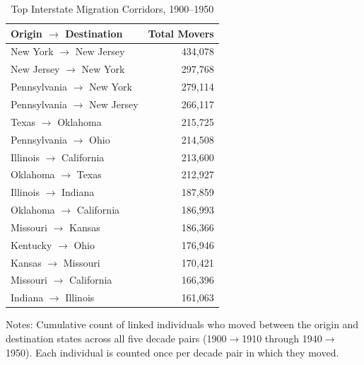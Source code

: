 
\begin{table}[H]
\centering
\caption{Top Interstate Migration Corridors, 1900--1950}
\begin{threeparttable}
\begin{tabular}{lr}
\toprule
Origin $\rightarrow$ Destination & Total Movers \\
\midrule
New York $\rightarrow$ New Jersey & 434,078 \\
New Jersey $\rightarrow$ New York & 297,768 \\
Pennsylvania $\rightarrow$ New York & 279,114 \\
Pennsylvania $\rightarrow$ New Jersey & 266,117 \\
Texas $\rightarrow$ Oklahoma & 215,725 \\
Pennsylvania $\rightarrow$ Ohio & 214,508 \\
Illinois $\rightarrow$ California & 213,600 \\
Oklahoma $\rightarrow$ Texas & 212,927 \\
Illinois $\rightarrow$ Indiana & 187,859 \\
Oklahoma $\rightarrow$ California & 186,993 \\
Missouri $\rightarrow$ Kansas & 186,366 \\
Kentucky $\rightarrow$ Ohio & 176,946 \\
Kansas $\rightarrow$ Missouri & 170,421 \\
Missouri $\rightarrow$ California & 166,396 \\
Indiana $\rightarrow$ Illinois & 161,063 \\
\bottomrule
\end{tabular}
\begin{tablenotes}[flushleft]
\small
\item Notes: Cumulative count of linked individuals who moved between the origin and destination states across all five decade pairs (1900$\rightarrow$1910 through 1940$\rightarrow$1950). Each individual is counted once per decade pair in which they moved.
\end{tablenotes}
\end{threeparttable}
\label{tab:migration_corridors}
\end{table}

